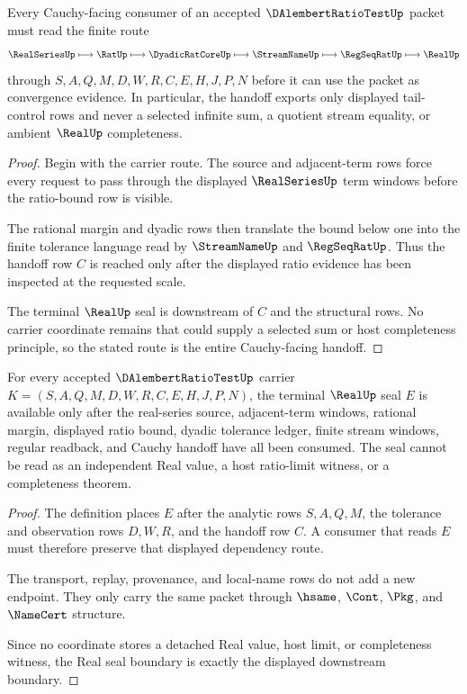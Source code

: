 \begin{theorem}
\label{thm:dalembert-ratio-test-cauchy-handoff}
Every Cauchy-facing consumer of an accepted $\DAlembertRatioTestUp$ packet must read the finite route
$$
\RealSeriesUp \longmapsto \RatUp \longmapsto \DyadicRatCoreUp \longmapsto \StreamNameUp \longmapsto \RegSeqRatUp \longmapsto \RealUp
$$
through $S,A,Q,M,D,W,R,C,E,H,J,P,N$ before it can use the packet as convergence evidence. In particular, the handoff exports only displayed tail-control rows and never a selected infinite sum, a quotient stream equality, or ambient $\RealUp$ completeness.
\end{theorem}
\begin{proof}
Begin with the carrier route. The source and adjacent-term rows force every request to pass through the displayed $\RealSeriesUp$ term windows before the ratio-bound row is visible.

The rational margin and dyadic rows then translate the bound below one into the finite tolerance language read by $\StreamNameUp$ and $\RegSeqRatUp$. Thus the handoff row $C$ is reached only after the displayed ratio evidence has been inspected at the requested scale.

The terminal $\RealUp$ seal is downstream of $C$ and the structural rows. No carrier coordinate remains that could supply a selected sum or host completeness principle, so the stated route is the entire Cauchy-facing handoff.
\end{proof}

\begin{theorem}
\label{thm:dalembert-ratio-test-real-seal-boundary}
For every accepted $\DAlembertRatioTestUp$ carrier $K=(S,A,Q,M,D,W,R,C,E,H,J,P,N)$, the terminal $\RealUp$ seal $E$ is available only after the real-series source, adjacent-term windows, rational margin, displayed ratio bound, dyadic tolerance ledger, finite stream windows, regular readback, and Cauchy handoff have all been consumed. The seal cannot be read as an independent Real value, a host ratio-limit witness, or a completeness theorem.
\end{theorem}
\begin{proof}
The definition places $E$ after the analytic rows $S,A,Q,M$, the tolerance and observation rows $D,W,R$, and the handoff row $C$. A consumer that reads $E$ must therefore preserve that displayed dependency route.

The transport, replay, provenance, and local-name rows do not add a new endpoint. They only carry the same packet through $\hsame$, $\Cont$, $\Pkg$, and $\NameCert$ structure.

Since no coordinate stores a detached Real value, host limit, or completeness witness, the Real seal boundary is exactly the displayed downstream boundary.
\end{proof}

